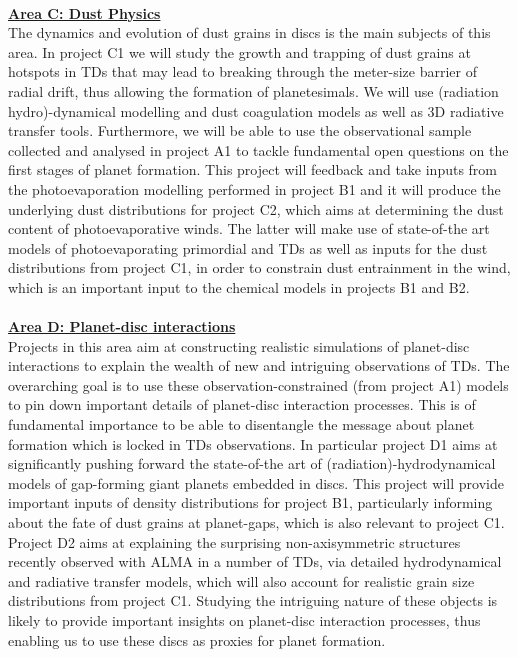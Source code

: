 \documentclass[12pt]{article}
\begin{document}
%
\mbox{}\vspace{1em}\\
\noindent\underline{\bf Area C: Dust Physics}\\
\noindent The dynamics and evolution of dust grains in discs is the
main subjects of this area. In project C1 we will study the growth and
trapping of dust grains at hotspots in TDs that may lead
to breaking through the meter-size barrier of radial drift, thus
allowing the formation of planetesimals. We will use (radiation
hydro)-dynamical modelling and dust coagulation models as well as 3D
radiative transfer tools. Furthermore, we will be able to use the
observational sample collected and analysed in project A1 to tackle
fundamental open questions on the first stages of planet
formation. This project will feedback and take inputs from the
photoevaporation modelling performed in project B1 and it will produce
the underlying dust distributions for project C2, which aims at
determining the dust content of photoevaporative winds. The latter
will make use of state-of-the art models of photoevaporating
primordial and TDs as well as inputs for the dust distributions from
project C1, in order to constrain dust entrainment in the wind, which
is an important input to the chemical models in projects B1 and B2. \\ 




\mbox{}\vspace{1em}\\
\noindent\underline{\bf Area D: Planet-disc interactions}\\
\noindent Projects in this area aim at constructing realistic
simulations of planet-disc interactions to explain the wealth of new
and intriguing observations of TDs. The overarching goal is to use
these observation-constrained (from project A1) models to pin down
important details of planet-disc interaction processes. This is of
fundamental importance to be able to disentangle the message about
planet formation which is locked in TDs observations. In particular
project D1 aims at significantly pushing forward the state-of-the art
of (radiation)-hydrodynamical models of gap-forming giant planets
embedded in discs. This project will provide important inputs of
density distributions for project B1, particularly informing about the
fate of dust grains at planet-gaps, which is also relevant to project
C1. Project D2 aims at explaining the surprising non-axisymmetric
structures recently observed with ALMA in a number of TDs, via
detailed hydrodynamical and radiative transfer models, which will also
account for realistic grain size distributions from project
C1. Studying the intriguing nature of these objects is likely to
provide important insights on planet-disc interaction processes, thus
enabling us to use these discs as proxies for planet formation.  \\ 
\end{document}
